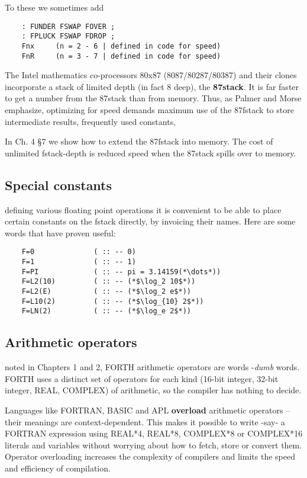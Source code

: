 To these we sometimes add

\begin{lstlisting}
    : FUNDER FSWAP FOVER ;
    : FPLUCK FSWAP FDROP ;
    Fnx     (n = 2 - 6 | defined in code for speed)
    FnR     (n = 3 - 7 | defined in code for speed)
\end{lstlisting}

The Intel mathematics co-processors 80x87 (8087/80287/80387)
and their clones incorporate a stack of limited depth (in fact 8
deep), the \textbf{87stack}. It is far faster to get a number from the 87stack
than from memory. Thus, as Palmer and Morse emphasize,
optimizing for speed demands maximum use of the 87fstack to store intermediate
results, frequently used constants, \etc

In Ch. 4 \S7 we show how to extend the 87fstack into memory. The
cost of unlimited fstack-depth is reduced speed when the 87stack
spills over to memory.

\subsection{Special constants}
 defining various floating point operations it is convenient to be
able to place certain constants on the fstack directly, by invoicing
their names. Here are some words that have proven useful:
\begin{lstlisting}
    F=0              ( :: -- 0)
    F=1              ( :: -- 1)
    F=PI             ( :: -- pi = 3.14159(*\dots*))
    F=L2(10)         ( :: -- (*$\log_2 10$*))
    F=L2(E)          ( :: -- (*$\log_2 e$*))
    F=L10(2)         ( :: -- (*$\log_{10} 2$*))
    F=LN(2)          ( :: -- (*$\log_e 2$*))
\end{lstlisting}
 
\subsection{Arithmetic operators}
 noted in Chapters 1 and 2, FORTH arithmetic operators are
words -\textit{dumb} words. FORTH uses a distinct set of operators
for each kind (16-bit integer, 32-bit integer, REAL, COMPLEX)
of arithmetic, so the compiler has nothing to decide.

Languages like FORTRAN, BASIC and APL \textbf{overload} arithmetic operators -- their
meanings are context-dependent. This
makes it possible to write -say- a FORTRAN expression using
REAL*4, REAL*8, COMPLEX*8 or COMPLEX*16 literals
and variables without worrying about how to fetch, store or
convert them. Operator overloading increases the complexity of
compilers and limits the speed and efficiency of compilation.

